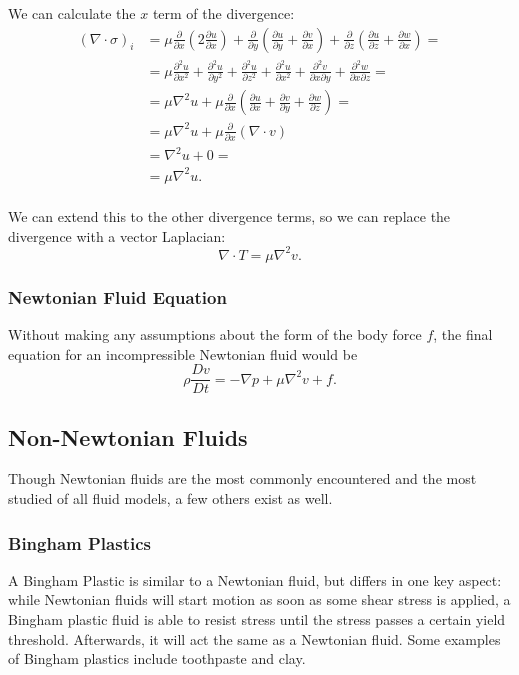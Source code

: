 \documentclass[a4paper]{article}
\begin{document}
We can calculate the $x$ term of the divergence:
\begin{align*}
(\nabla\cdot\sigma)_i &= \mu\frac{\partial}{\partial x}(2\frac{\partial u}{\partial x}) + \frac{\partial}{\partial y}(\frac{\partial u}{\partial y}+\frac{\partial v}{\partial x}) + \frac{\partial}{\partial z}(\frac{\partial u}{\partial z}+\frac{\partial w}{\partial x}) = \\
&= \mu\frac{\partial^2 u}{\partial x^2} + \frac{\partial^2 u}{\partial y^2} + \frac{\partial^2 u}{\partial z^2} + \frac{\partial^2 u}{\partial x^2} + \frac{\partial^2 v}{\partial x \partial y} + \frac{\partial^2 w}{\partial x \partial z} = \\
&= \mu\nabla^2 u + \mu\frac{\partial}{\partial x}(\frac{\partial u}{\partial x} + \frac{\partial v}{\partial y} + \frac{\partial w}{\partial z}) = \\
&= \mu\nabla^2 u + \mu\frac{\partial}{\partial x}(\nabla\cdot v) \\
&= \nabla^2 u + 0 = \\
&= \mu\nabla^2 u.\\
\end{align*}

We can extend this to the other divergence terms, so we can replace the divergence with a vector Laplacian:
\[\nabla\cdot T = \mu \nabla^2 v.\]

\subsubsection*{Newtonian Fluid Equation}
Without making any assumptions about the form of the body force $f$, the final equation for an incompressible Newtonian fluid would be
\[\rho\frac{Dv}{Dt} = -\nabla p + \mu \nabla^2 v + f.\]

\subsection*{Non-Newtonian Fluids}

Though Newtonian fluids are the most commonly encountered and the most studied of all fluid models, a few others exist as well. 

\subsubsection*{Bingham Plastics}
A Bingham Plastic is similar to a Newtonian fluid, but differs in one key aspect: while Newtonian fluids will start motion as soon as some shear stress is applied, a Bingham plastic fluid is able to resist stress until the stress passes a certain yield threshold. Afterwards, it will act the same as a Newtonian fluid. Some examples of Bingham plastics include toothpaste and clay. 
\end{document}
